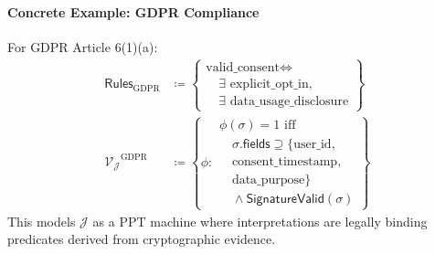 \documentclass[preprint,12pt]{elsarticle}
\begin{document}
            \begin{algorithm}[H]
                \caption{Interpret: Semantic Legal Interpretation}
                \label{alg:interpret}

                \end{algorithm}


            \paragraph{Concrete Example: GDPR Compliance}
                For GDPR Article 6(1)(a):
                \begin{align*}
                    \mathsf{Rules}_{\text{GDPR}} &\coloneqq \left\{ 
                    \begin{array}{l}
                    \text{valid\_consent} \Leftrightarrow \\
                    \quad \exists \text{ explicit\_opt\_in}, \\
                    \quad \exists \text{ data\_usage\_disclosure}
                    \end{array} 
                    \right\} \\
                    \mathcal{V_J}^{\text{GDPR}} &\coloneqq \left\{ 
                    \phi : 
                    \begin{array}{l}
                    \phi(\sigma) = 1 \text{ iff } \\
                    \quad \sigma.\mathsf{fields} \supseteq \{\text{user\_id}, \\
                    \quad \text{consent\_timestamp}, \\
                    \quad \text{data\_purpose}\} \\
                    \quad \land \mathsf{SignatureValid}(\sigma)
                    \end{array}
                    \right\}
                \end{align*}
                This models $\mathcal{J}$ as a PPT machine where interpretations are legally binding predicates derived from cryptographic evidence.
\end{document}
